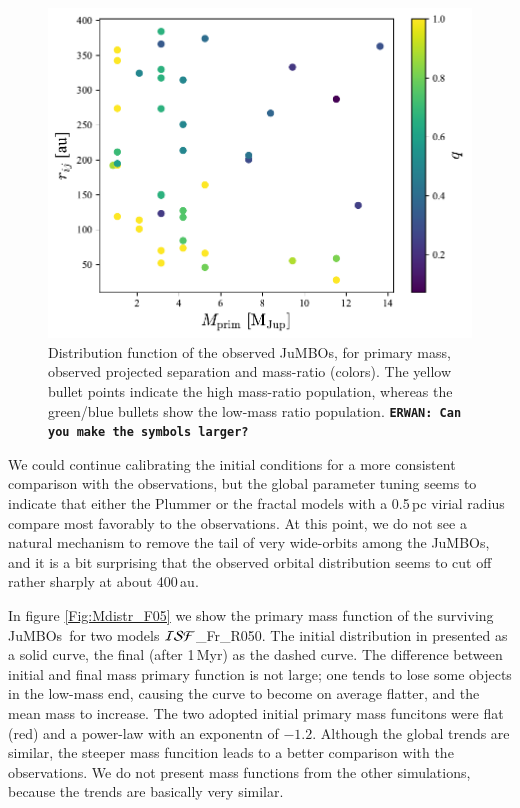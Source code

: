 \documentclass[submission,phys]{lib/SciPost}
\newcommand{\erwan}[1] {{\texttt{\textbf{ERWAN: #1}}} }
\newcommand{\jumbos}{\mbox{JuMBOs}}
\begin{document}
\begin{figure}
    \centering
    \includegraphics[width=0.75\columnwidth]{figures/obs_q_mprim_sep.pdf}
    \caption{Distribution function of the observed \jumbos, for
      primary mass, observed projected separation and mass-ratio
      (colors). The yellow bullet points indicate the high mass-ratio
      population, whereas the green/blue bullets show the low-mass
      ratio population.
      \erwan{Can you make the symbols larger?}
    }
    \label{Fig:obs_q_mprim_sep}
\end{figure}

We could continue calibrating the initial conditions for a more
consistent comparison with the observations, but the global parameter
tuning seems to indicate that either the Plummer or the fractal models
with a 0.5\,pc virial radius compare most favorably to the
observations.  At this point, we do not see a natural mechanism to
remove the tail of very wide-orbits among the \jumbos, and it is a bit
surprising that the observed orbital distribution seems to cut off
rather sharply at about 400\,au.

In figure \ref{Fig:Mdistr_F05} we show the primary mass function of
the surviving \jumbos\, for two models ${\cal ISF}$\_Fr\_R050.  The
initial distribution in presented as a solid curve, the final (after
1\,Myr) as the dashed curve. The difference between initial and final
mass primary function is not large; one tends to lose some objects in
the low-mass end, causing the curve to become on average flatter, and
the mean mass to increase. The two adopted initial primary mass
funcitons were flat (red) and a power-law with an exponentn of $-1.2$.
Although the global trends are similar, the steeper mass funcition
leads to a better comparison with the observations.  We do not present
mass functions from the other simulations, because the trends are
basically very similar.
\end{document}
